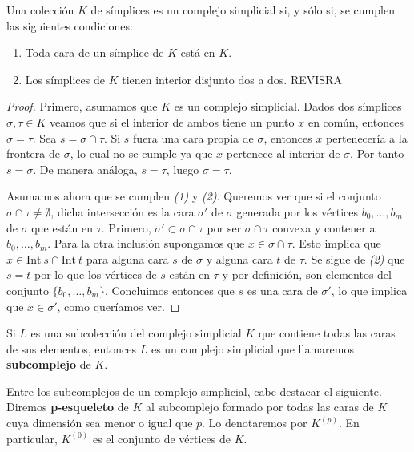 \begin{lema}
	Una colección $K$ de símplices es un complejo simplicial si, y sólo si, se cumplen las siguientes 
	condiciones:
	\begin{enumerate}
		\item Toda cara de un símplice de $K$ está en $K$.
		\item Los símplices de $K$ tienen interior disjunto dos a dos. REVISRA
	\end{enumerate}
\end{lema}
\begin{proof}
	Primero, asumamos que $K$ es un complejo simplicial. Dados dos símplices $\sigma, \tau \in K$ veamos que si el interior de ambos tiene un punto $x$ en común, entonces $\sigma = \tau$. Sea $s = \sigma \cap \tau$. Si $s$ fuera una cara propia de $\sigma$, entonces $x$ pertenecería a la frontera de $\sigma$, lo cual no se cumple ya que $x$ pertenece al interior de $\sigma$. Por tanto $s = \sigma$. De manera análoga, $s = \tau$, luego $\sigma = \tau$.
	
	Asumamos ahora que se cumplen \textit{(1)} y \textit{(2)}. Queremos ver que si el conjunto $\sigma \cap \tau \neq \emptyset$,  dicha intersección es la cara $\sigma'$ de $\sigma$ generada por los vértices $b_0,\dots,b_m$ de $\sigma$ que están en $\tau$. Primero, $\sigma' \subset \sigma \cap \tau$ por ser $\sigma \cap \tau$ convexa y contener a $b_0, \dots, b_m$. Para la otra inclusión supongamos que $x \in \sigma \cap \tau$. Esto implica que $x \in \text{Int}\ s \cap \text{Int}\ t$ para alguna cara $s$ de $\sigma$ y alguna cara $t$ de $\tau$. Se sigue de \textit{(2)} que $s = t$ por lo que los vértices de $s$ están en $\tau$ y por definición, son elementos del conjunto $\{b_0, \dots, b_m\}$.  Concluimos entonces que $s$ es una cara de $\sigma'$, lo que implica que $x \in \sigma'$, como queríamos ver.
\end{proof}

\begin{definicion}
	Si $L$ es una subcolección del complejo simplicial $K$ que contiene todas las caras de sus 
	elementos, entonces $L$ es un complejo simplicial que llamaremos \textbf{subcomplejo} de $K$.
\end{definicion}
Entre los subcomplejos de un complejo simplicial, cabe destacar el siguiente. Diremos \textbf{p-esqueleto} 
de $K$ al subcomplejo formado por todas las caras de $K$ cuya dimensión sea menor o igual que $p$. Lo denotaremos por $K^{(p)}$. En particular, $K^{(0)}$ es el conjunto de vértices de $K$.


